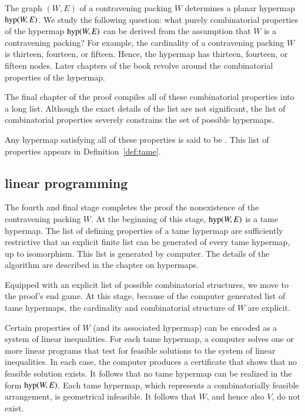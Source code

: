 The graph $(W,E)$ of a contravening packing $W$ determines a planar hypermap
${\operatorname{hyp}}(W,E)$. We study the following question: what  purely
combinatorial properties of the hypermap ${\operatorname{hyp}}(W,E)$ can be derived from
the assumption  that
$W$ is a contravening packing?  For example, the cardinality of a
contravening packing $W$ is thirteen, fourteen, or fifteen.  Hence, the hypermap
has thirteen, fourteen, or fifteen nodes.   Later chapters of the book
revolve around the combinatorial properties of the
hypermap.

The final chapter of the proof compiles all of these combinatorial
properties into a long list.  
Although the exact details of the list are not significant,
the list of combinatorial properties severely constrains the set of possible
hypermaps.  

Any hypermap satisfying all of these properties is said to be
.  This list of properties appears in
Definition~\ref{def:tame}.


\subsection{linear programming}

The fourth and final stage completes the proof the nonexistence of
the contravening packing $W$.  At the beginning of this stage,
${\operatorname{hyp}}(W,E)$ is a tame hypermap.  The list of defining properties
of a tame hypermap are sufficiently restrictive that an explicit finite
list can be generated of every tame hypermap, up to isomorphism.  
This list is generated by computer.  The details of the algorithm are
described in the chapter on hypermaps.

Equipped with an explicit list of possible combinatorial structures,
we move to the proof's end game.  At this stage, because of the computer
generated list of tame hypermaps, the cardinality and
combinatorial structure of $W$ are explicit.

Certain properties of $W$ (and its associated hypermap)
 can be encoded as a system of linear inequalities.  For each tame hypermap,
a computer solves one or more linear programs that test for feasible
solutions to the system of linear inequalities.  In each case, the
computer produces a certificate that shows that no feasible solution
exists.  It follows that no tame hypermap can be realized in the form
${\operatorname{hyp}}(W,E)$.  Each tame hypermap, which represents a
combinatorially feasible arrangement, is geometrical infeasible.  It
follows that $W$, and hence also $V$, do not exist.

